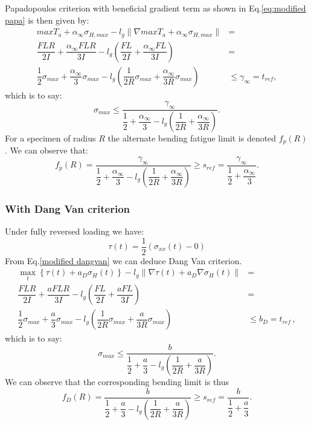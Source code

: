 Papadopoulos criterion with beneficial gradient term as shown in Eq.\eqref{eq:modified papa} is then given by:
\begin{equation}
	\begin{split}
		maxT_a+\alpha_\infty\sigma_{H,max}-l_g\parallel\nabla{maxT_a}+\alpha_\infty\sigma_{H,max}\parallel&=\\\dfrac{FLR}{2I} +\dfrac{\alpha_\infty FLR}{3I}-l_g\left( \dfrac{FL}{2I}+\dfrac{\alpha_\infty FL}{3I}\right) &=\\ \dfrac{1}{2}\sigma_{max}+\dfrac{\alpha_\infty}{3}\sigma_{max}-l_g\left( \dfrac{1}{2R}\sigma_{max}+\dfrac{\alpha_\infty}{3R}\sigma_{max}\right) &\leqslant \gamma_\infty = t_{ref} ,
	\end{split}
\end{equation}
which is to say:
\begin{equation}
	\sigma_{max}\leqslant\dfrac{\gamma_\infty}{\dfrac{1}{2}+\dfrac{\alpha_\infty}{3}-l_g(\dfrac{1}{2R}+\dfrac{\alpha_\infty}{3R})} .
\end{equation}
For a specimen of radius $R$
the alternate bending fatigue limit is denoted $f_p(R)$.
We can observe that:
\begin{equation}
	f_p(R)=\dfrac{\gamma_\infty}{\dfrac{1}{2}+\dfrac{\alpha_\infty}{3}-l_g\left( \dfrac{1}{2R}+\dfrac{\alpha_\infty}{3R}\right) }\geqslant s_{ref} = \dfrac{\gamma_\infty}{\dfrac{1}{2}+\dfrac{\alpha_\infty}{3}}.
	\label{papa-fr}
\end{equation}

\subsubsection{With Dang Van criterion}  
Under fully reversed loading we have:
$$\tau(t)=\dfrac{1}{2}(\sigma_{xx}(t)-0)$$ 
From Eq.\eqref{modified dangvan} we can deduce Dang Van criterion.
\begin{equation}
	\begin{split}
		\max \limits_{t}\left\{\tau{(t)}+a_D\sigma_H(t)\right\}-l_g\parallel{\nabla\tau{(t)}}+a_D\nabla\sigma_H(t)\parallel&=\\ \dfrac{FLR}{2I} +\dfrac{aFLR}{3I}-l_g\left( \dfrac{FL}{2I}+\dfrac{aFL}{3I}\right) &=\\ \dfrac{1}{2}\sigma_{max}+\dfrac{a}{3}\sigma_{max}-l_g\left( \dfrac{1}{2R}\sigma_{max}+\dfrac{a}{3R}\sigma_{max}\right) &\leqslant b_D= t_{ref}\, ,
	\end{split}
\end{equation}
which is to say:
\begin{equation}
	\sigma_{max}\leqslant\dfrac{b}{\dfrac{1}{2}+\dfrac{a}{3}-l_g\left( \dfrac{1}{2R}+\dfrac{a}{3R}\right) }.
\end{equation}
We can observe that the corresponding bending limit is thus
\begin{equation}f_D(R)=\dfrac{b}{\dfrac{1}{2}+\dfrac{a}{3}-l_g\left( \dfrac{1}{2R}+\dfrac{a}{3R}\right) }\geqslant s_{ref} = \dfrac{b}{\dfrac{1}{2}+\dfrac{a}{3}}.
\end{equation}


